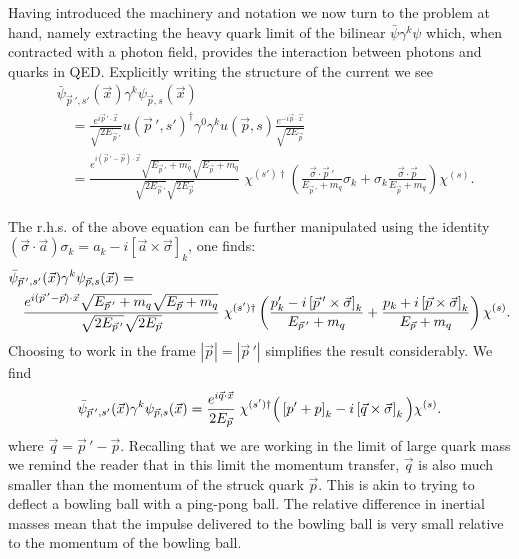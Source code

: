 Having introduced the machinery and notation we now turn to the problem at hand, namely extracting the heavy quark limit of the bilinear $\bar{\psi} \gamma^k \psi $ which, when contracted with a photon field, provides the interaction between photons and quarks in QED. Explicitly writing the structure of the current we see 
\begin{align*}
&\bar{\psi }_{ \vec{p}\,' ,s'}(\vec{x})  \gamma^k \psi_{\vec{p}, s}(\vec{x}) \\
&\quad= \frac{e^{i\vec{p}\,' \cdot \vec{x}}}{\sqrt{2E_{\vec{p}\,'}}}u(\vec{p}\,',s')^\dagger \gamma^0\gamma^k u(\vec{p},s) \frac{e^{-i\vec{p} \cdot \vec{x}}}{\sqrt{2E_{\vec{p}}}} \\
&\quad= \frac{e^{i (\vec{p}\,'-\vec{p})\cdot \vec{x}} \sqrt{E_{\vec{p}\,'} + m_q}\sqrt{E_{\vec{p}} + m_q}}{\sqrt{2E_{\vec{p}\,'}}\sqrt{2E_{\vec{p}}}}  \;\chi^{(s')\dagger} \left( \frac{\vec{\sigma}\cdot \vec{p}\,'}{E_{\vec{p}\,'} + m_q} \sigma_k +  \sigma_k\frac{\vec{\sigma}\cdot \vec{p}}{E_{\vec{p}} + m_q} \right) \chi^{(s)}.
\end{align*} 

The r.h.s. of the above equation can be further manipulated using the identity $ \left( \vec{\sigma} \cdot \vec{a} \right) \sigma_k = a_k - i \left[ \vec{a} \times \vec{\sigma} \right]_k $, one finds:
\begin{align*}
&\bar{\psi}_{\vec{p}\,' ,s'}(\vec{x})   \gamma^k \psi_{\vec{p}, s}(\vec{x}) = \\
&\quad \frac{e^{i (\vec{p}\,'-\vec{p})\cdot \vec{x}}  \sqrt{E_{\vec{p}\,'} + m_q}\sqrt{E_{\vec{p}} + m_q}}{\sqrt{2E_{\vec{p}\,'}}\sqrt{2E_{\vec{p}}}} \;\chi^{(s')\dagger} \left( \frac{ p'_k - i\left[ \vec{p}\,' \times \vec{\sigma} \right]_k}{E_{\vec{p}\,'} + m_q} +  \frac{ p_k + i\left[\vec{p} \times \vec{\sigma} \right]_k}{E_{\vec{p}} + m_q} \right) \chi^{(s)}. 
\end{align*} 
Choosing to work in the frame $|\vec{p}| = |\vec{p}\,'|$ simplifies the result considerably. We find 
\begin{equation*}
\bar{\psi}_{\vec{p}\,' ,s'}(\vec{x})  \gamma^k \psi_{\vec{p}, s}(\vec{x}) = \frac{e^{i \vec{q}\cdot\vec{x}} }{2E_{\vec{p}}} \;\chi^{(s')\dagger} \Big(  \left[ p' + p\right]_k  -i\left[\vec{q} \times \vec{\sigma} \right]_k \Big) \chi^{(s)}. 
\end{equation*} 
where $\vec{q} = \vec{p}\,' - \vec{p}$. Recalling that we are working in the limit of large quark mass we remind the reader that in this limit the momentum transfer, $\vec{q}$ is also much smaller than the momentum of the struck quark $\vec{p}$. This is akin to trying to deflect a bowling ball with a ping-pong ball. The relative difference in inertial masses mean that the impulse delivered to the bowling ball is very small relative to the momentum of the bowling ball.  

